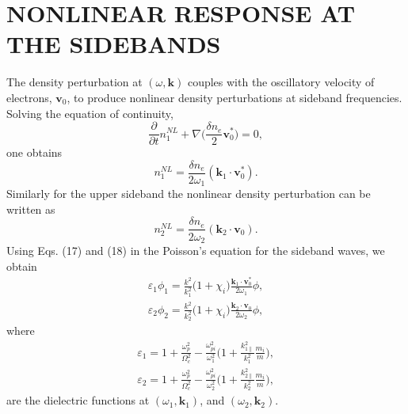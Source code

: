 \documentclass[aip,pop,amsmath,amssymb,showpacs,reprint,floatfix,lengthcheck]{revtex4-1}
\begin{document}
\section{NONLINEAR RESPONSE  AT THE SIDEBANDS}
The density perturbation at $(\omega, \textbf{k})$ couples with the oscillatory velocity of electrons, $\textbf{v}_{0}$, to produce nonlinear density perturbations at sideband frequencies. Solving the equation of continuity, 
\begin{equation}
 \frac{\partial}{\partial t}n_{1}^{NL}+\nabla\biggl(\frac{\delta n_{e}}{2}\textbf{v}_{0}^*\biggr)=0,
\end{equation}
one obtains 
\begin{equation}
 n_{1}^{NL}=\frac{\delta n_{e}}{2\omega_{1}}(\textbf{k}_{1}\cdot\textbf{v}_{0}^*).
\end{equation}
Similarly for the upper sideband the nonlinear density perturbation can be written as
\begin{equation}
 n_{2}^{NL}=\frac{\delta n_{e}}{2\omega_{2}}(\textbf{k}_{2}\cdot\textbf{v}_{0}).
\end{equation}
  Using Eqs. (17) and (18) in the Poisson's equation for the sideband waves, we obtain
\begin{eqnarray}
\varepsilon_{1}\phi_{1}=\frac{k^2}{k_{1}^2}\biggl(1+\chi_{i}\biggr)\frac{\textbf{k}_{1}\cdot{\textbf{v}}_{0}^*}{2\omega_{1}}\phi,\nonumber\\
\varepsilon_{2}\phi_{2}=\frac{k^2}{k_{2}^2}\biggl(1+\chi_{i}\biggr)\frac{\textbf{k}_{2}\cdot{\textbf{v}}_{0}}{2\omega_{2}}\phi,
\end{eqnarray}
where
\begin{eqnarray}
 \varepsilon_{1}=1+\frac{\omega_{p}^2}{\Omega_{c}^2}-\frac{\omega_{pi}^2}{\omega_{1}^2}\biggl(1+\frac{k_{1\parallel}^2}{k_{1}^2}\frac{m_{i}}{m}\biggr),\nonumber\\
 \varepsilon_{2}=1+\frac{\omega_{p}^2}{\Omega_{c}^2}-\frac{\omega_{pi}^2}{\omega_{2}^2}\biggl(1+\frac{k_{2\parallel}^2}{k_{2}^2}\frac{m_{i}}{m}\biggr),
\end{eqnarray}
are the dielectric functions at $(\omega_{1},\textbf{k}_{1})$, and $(\omega_{2},\textbf{k}_{2})$.
\end{document}

